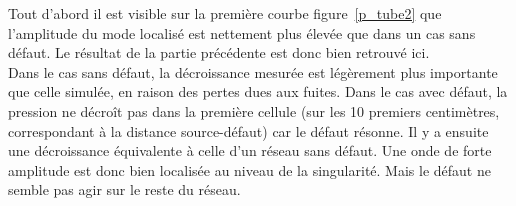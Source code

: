 Tout d'abord il est visible sur la première courbe figure~\ref{p_tube2} que l'amplitude du mode localisé est nettement plus élevée que dans un cas sans défaut. Le résultat de la partie précédente est donc bien retrouvé ici. \\

Dans le cas sans défaut, la décroissance mesurée est légèrement plus importante que celle simulée, en raison des pertes dues aux fuites.
Dans le cas avec défaut, la pression ne décroît pas dans la première cellule (sur les 10 premiers centimètres, correspondant à la distance source-défaut) car le défaut résonne. Il y a ensuite une décroissance équivalente à celle d'un réseau sans défaut.
Une onde de forte amplitude est donc bien localisée au niveau de la singularité. Mais le défaut ne semble pas agir sur le reste du réseau.





